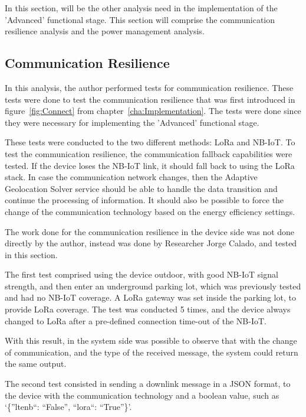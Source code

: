 In this section, will be the other analysis  need in the implementation of the 'Advanced'  functional stage. This section will comprise the communication resilience analysis and the power management analysis.


\subsection{Communication Resilience}
\label{sec:Comunication_Resilience}

In this analysis, the author performed tests for communication resilience. These tests were done to test the communication resilience that was first introduced in figure~\ref{fig:Connect} from chapter~\ref{cha:Implementation}. The tests were done since they were necessary for implementing the 'Advanced' functional stage.

These tests were conducted to the two different methods: LoRa and NB-IoT. To test the communication resilience, the communication fallback capabilities were tested. If the device loses the NB-IoT link, it should fall back to using the LoRa stack.
In case the communication network changes, then the Adaptive Geolocation Solver service should be able to handle the data transition and continue the processing of information. It should also be possible to force the change of the communication technology based on the energy efficiency settings.



The work done for the communication resilience in the device side was not done directly by the author, instead was done by Researcher Jorge Calado, and tested in this section.

The first test comprised using the device outdoor, with good NB-IoT signal strength, and then enter an underground parking lot, which was previously tested and had no NB-IoT coverage. A LoRa gateway was set inside the parking lot, to provide LoRa coverage. The test was conducted 5 times, and the device always changed to LoRa after a pre-defined connection time-out of the NB-IoT.

With this result, in the system side was possible to observe that with the change of communication, and the type of the received message, the system could return the same output.

The second test consisted in sending a downlink message in a JSON format, to the device with the communication technology and a boolean value, such as ‘\{”ltenb“: “False”, “lora“: “True”\}’. 

